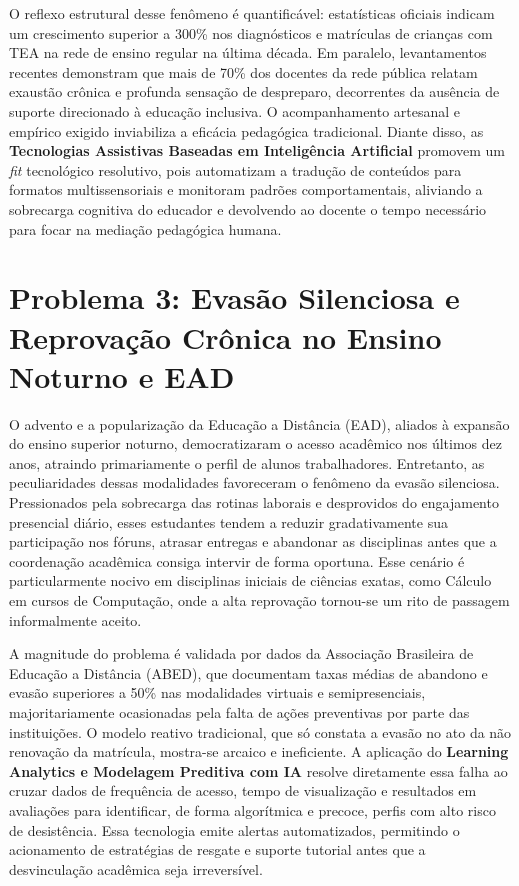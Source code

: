 O reflexo estrutural desse fenômeno é quantificável: estatísticas oficiais indicam um crescimento superior a 300\% nos diagnósticos e matrículas de crianças com TEA na rede de ensino regular na última década. Em paralelo, levantamentos recentes demonstram que mais de 70\% dos docentes da rede pública relatam exaustão crônica e profunda sensação de despreparo, decorrentes da ausência de suporte direcionado à educação inclusiva. O acompanhamento artesanal e empírico exigido inviabiliza a eficácia pedagógica tradicional. Diante disso, as \textbf{Tecnologias Assistivas Baseadas em Inteligência Artificial} promovem um \textit{fit} tecnológico resolutivo, pois automatizam a tradução de conteúdos para formatos multissensoriais e monitoram padrões comportamentais, aliviando a sobrecarga cognitiva do educador e devolvendo ao docente o tempo necessário para focar na mediação pedagógica humana.


\section*{Problema 3: Evasão Silenciosa e Reprovação Crônica no Ensino Noturno e EAD}

O advento e a popularização da Educação a Distância (EAD), aliados à expansão do ensino superior noturno, democratizaram o acesso acadêmico nos últimos dez anos, atraindo primariamente o perfil de alunos trabalhadores. Entretanto, as peculiaridades dessas modalidades favoreceram o fenômeno da evasão silenciosa. Pressionados pela sobrecarga das rotinas laborais e desprovidos do engajamento presencial diário, esses estudantes tendem a reduzir gradativamente sua participação nos fóruns, atrasar entregas e abandonar as disciplinas antes que a coordenação acadêmica consiga intervir de forma oportuna. Esse cenário é particularmente nocivo em disciplinas iniciais de ciências exatas, como Cálculo em cursos de Computação, onde a alta reprovação tornou-se um rito de passagem informalmente aceito.

A magnitude do problema é validada por dados da Associação Brasileira de Educação a Distância (ABED), que documentam taxas médias de abandono e evasão superiores a 50\% nas modalidades virtuais e semipresenciais, majoritariamente ocasionadas pela falta de ações preventivas por parte das instituições. O modelo reativo tradicional, que só constata a evasão no ato da não renovação da matrícula, mostra-se arcaico e ineficiente. A aplicação do \textbf{Learning Analytics e Modelagem Preditiva com IA} resolve diretamente essa falha ao cruzar dados de frequência de acesso, tempo de visualização e resultados em avaliações para identificar, de forma algorítmica e precoce, perfis com alto risco de desistência. Essa tecnologia emite alertas automatizados, permitindo o acionamento de estratégias de resgate e suporte tutorial antes que a desvinculação acadêmica seja irreversível.

